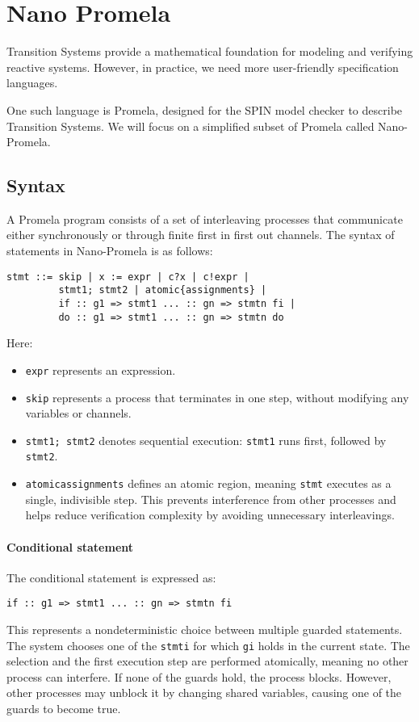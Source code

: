 \section{Nano Promela}

Transition Systems provide a mathematical foundation for modeling and verifying reactive systems. 
However, in practice, we need more user-friendly specification languages.

One such language is Promela, designed for the SPIN model checker to describe Transition Systems. 
We will focus on a simplified subset of Promela called Nano-Promela.

\subsection{Syntax}
A Promela program consists of a set of interleaving processes that communicate either synchronously or through finite first in first out channels.
The syntax of statements in Nano-Promela is as follows:
\begin{verbatim}
stmt ::= skip | x := expr | c?x | c!expr |
         stmt1; stmt2 | atomic{assignments} |
         if :: g1 => stmt1 ... :: gn => stmtn fi |
         do :: g1 => stmt1 ... :: gn => stmtn do
\end{verbatim}
Here: 
\begin{itemize}
    \item \texttt{expr} represents an expression.
    \item \texttt{skip} represents a process that terminates in one step, without modifying any variables or channels.
    \item \texttt{stmt1; stmt2} denotes sequential execution: \texttt{stmt1} runs first, followed by \texttt{stmt2}.
    \item \texttt{atomic{assignments}} defines an atomic region, meaning \texttt{stmt} executes as a single, indivisible step. 
        This prevents interference from other processes and helps reduce verification complexity by avoiding unnecessary interleavings.
\end{itemize}

\paragraph*{Conditional statement}
The conditional statement is expressed as: 
\begin{verbatim}
if :: g1 => stmt1 ... :: gn => stmtn fi
\end{verbatim}
This represents a nondeterministic choice between multiple guarded statements.
The system chooses one of the \texttt{stmti} for which \texttt{gi} holds in the current state.
The selection and the first execution step are performed atomically, meaning no other process can interfere.
If none of the guards hold, the process blocks.
However, other processes may unblock it by changing shared variables, causing one of the guards to become true.

